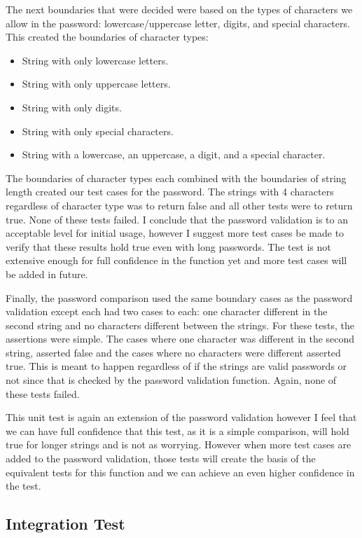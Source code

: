 \documentclass[a4paper]{article}
\begin{document}
The next boundaries that were decided were based on the types of characters we allow in the password: lowercase/uppercase letter, digits, and special characters.
This created the boundaries of character types:

\begin{itemize}
   \item String with only lowercase letters.
   \item String with only uppercase letters.
   \item String with only digits.
   \item String with only special characters.
   \item String with a lowercase, an uppercase, a digit, and a special character.
\end{itemize}

The boundaries of character types each combined with the boundaries of string length created our test cases for the password.
The strings with 4 characters regardless of character type was to return false and all other tests were to return true.
None of these tests failed.
I conclude that the password validation is to an acceptable level for initial usage, however I suggest more test cases be made to verify that these results hold true even with long passwords.
The test is not extensive enough for full confidence in the function yet and more test cases will be added in future.

Finally, the password comparison used the same boundary cases as the password validation except each had two cases to each: one character different in the second string and no characters different between the strings.
For these tests, the assertions were simple.
The cases where one character was different in the second string, asserted false and the cases where no characters were different asserted true.
This is meant to happen regardless of if the strings are valid passwords or not since that is checked by the password validation function.
Again, none of these tests failed.

This unit test is again an extension of the password validation however I feel that we can have full confidence that this test, as it is a simple comparison, will hold true for longer strings and is not as worrying.
However when more test cases are added to the password validation, those tests will create the basis of the equivalent tests for this function and we can achieve an even higher confidence in the test.

\subsection{Integration Test}
\end{document}
